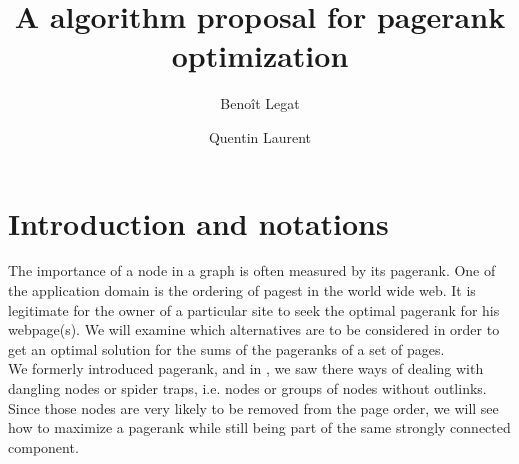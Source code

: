 \documentclass{article}
\author{Benoît Legat \and Quentin Laurent}
\title{A algorithm proposal for pagerank optimization}
\newcommand{\1}{\mathbf{1}}
\theoremstyle{definition}
\begin{document}
\maketitle

\section{Introduction and notations}
The importance of a node in a graph is often measured by its pagerank. One of the application domain is the ordering of pagest in the world wide web. It is legitimate for the owner of a particular site to seek the optimal pagerank for his webpage(s). We will examine which alternatives are to be considered in order to get an optimal solution for the sums of the pageranks of a set of pages.\\
We formerly introduced pagerank, and in \cite{leskovec}, we saw there ways of dealing with dangling nodes or spider traps, i.e. nodes or groups of nodes without outlinks. Since those nodes are very likely to be removed from the page order, we will see how to maximize a pagerank while still being part of the same strongly connected component.\\
\end{document}
